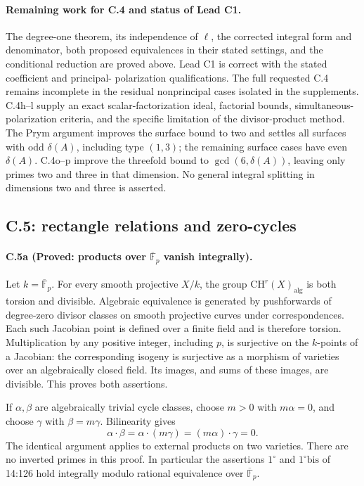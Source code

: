 




\paragraph{Remaining work for C.4 and status of Lead C1.}
The degree-one theorem, its independence of $\ell$, the corrected
integral form and denominator, both proposed equivalences in their
stated settings, and the conditional reduction are proved above.
Lead C1 is correct with the stated coefficient and principal-
polarization qualifications. The full requested C.4 remains
incomplete in the residual nonprincipal cases isolated in the
supplements. C.4h--l supply an exact scalar-factorization ideal,
factorial bounds, simultaneous-polarization criteria, and the specific
limitation of the divisor-product method. The Prym argument improves
the surface bound to two and settles all surfaces with odd
$\delta(A)$, including type $(1,3)$; the remaining surface cases have
even $\delta(A)$. C.4o--p improve the threefold bound to
$\gcd(6,\delta(A))$, leaving only primes two and three in that
dimension. No general integral splitting in dimensions two and
three is asserted.

\subsection{C.5: rectangle relations and zero-cycles}

\paragraph{C.5a (Proved: products over $\overline{\mathbb F}_p$ vanish integrally).}
Let $k=\overline{\mathbb F}_p$. For every smooth projective $X/k$,
the group $\mathrm{CH}^r(X)_{\mathrm{alg}}$ is both torsion and
divisible. Algebraic equivalence is generated by pushforwards of
degree-zero divisor classes on smooth projective curves under
correspondences. Each such Jacobian point is defined over a finite
field and is therefore torsion. Multiplication by any positive
integer, including $p$, is surjective on the $k$-points of a Jacobian:
the corresponding isogeny is surjective as a morphism of varieties
over an algebraically closed field. Its images, and sums of these
images, are divisible. This proves both assertions.

If $\alpha,\beta$ are algebraically trivial cycle classes, choose
$m>0$ with $m\alpha=0$, and choose $\gamma$ with $\beta=m\gamma$.
Bilinearity gives
\[
 \alpha\cdot\beta=\alpha\cdot(m\gamma)=(m\alpha)\cdot\gamma=0.
\]
The identical argument applies to external products on two varieties.
There are no inverted primes in this proof. In particular the
assertions $1^\circ$ and $1^\circ\mathrm{bis}$ of 14:126 hold integrally
modulo rational equivalence over $\overline{\mathbb F}_p$.

